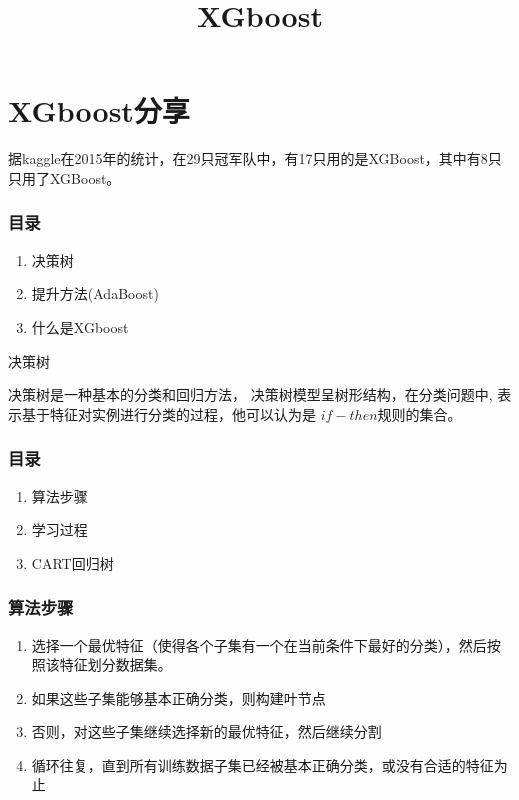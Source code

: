 \documentclass[11pt]{article}
\title{XGboost}
\providecommand{\tightlist}{%
      \setlength{\itemsep}{0pt}\setlength{\parskip}{0pt}}
\begin{document}
    
    
    \maketitle
    
    

    
    \section{XGboost分享}\label{xgboostux5206ux4eab}

据kaggle在2015年的统计，在29只冠军队中，有17只用的是XGBoost，其中有8只只用了XGBoost。

    \subsubsection{目录}\label{ux76eeux5f55}

\begin{enumerate}
\def\labelenumi{\arabic{enumi}.}
\tightlist
\item
  决策树
\item
  提升方法(AdaBoost)
\item
  什么是XGboost
\end{enumerate}

    决策树

 决策树是一种基本的分类和回归方法， 决策树模型呈树形结构，在分类问题中,
表示基于特征对实例进行分类的过程，他可以认为是 \(if-then\)规则的集合。

    \subsubsection{目录}\label{ux76eeux5f55}

\begin{enumerate}
\def\labelenumi{\arabic{enumi}.}
\tightlist
\item
  算法步骤
\item
  学习过程
\item
  CART回归树
\end{enumerate}

    \subsubsection{算法步骤}\label{ux7b97ux6cd5ux6b65ux9aa4}

\begin{enumerate}
\def\labelenumi{\arabic{enumi}.}
\tightlist
\item
  选择一个最优特征（使得各个子集有一个在当前条件下最好的分类），然后按照该特征划分数据集。
\item
  如果这些子集能够基本正确分类，则构建叶节点
\item
  否则，对这些子集继续选择新的最优特征，然后继续分割
\item
  循环往复，直到所有训练数据子集已经被基本正确分类，或没有合适的特征为止
\end{enumerate}
\end{document}
